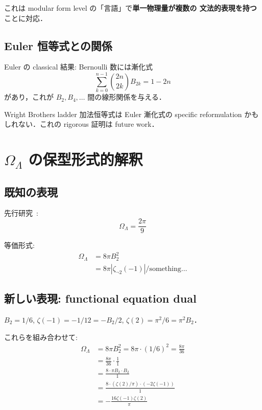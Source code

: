 \documentclass[11pt,a4paper]{article}
\begin{document}
これは modular form level の「言語」で\textbf{単一物理量が複数の
文法的表現を持つ}ことに対応．

\subsection{Euler 恒等式との関係}

Euler の classical 結果: Bernoulli 数には漸化式
\begin{equation}
\sum_{k=0}^{n-1}\binom{2n}{2k} B_{2k} = 1 - 2n
\end{equation}
があり，これが $B_2, B_4, \ldots$ 間の線形関係を与える．

Wright Brothers ladder 加法恒等式は Euler 漸化式の specific
reformulation かもしれない．これの rigorous 証明は future work．

\section{$\Omega_\Lambda$ の保型形式的解釈}

\subsection{既知の表現}

先行研究~\cite{wb-wdw}:
\begin{equation}
\Omega_\Lambda = \frac{2\pi}{9}
\end{equation}

等価形式:
\begin{align}
\Omega_\Lambda &= 8\pi B_2^2\\
&= 8\pi |\zeta_{\neg 2}(-1)|/\text{something}\ldots
\end{align}

\subsection{新しい表現: functional equation dual}

$B_2 = 1/6$, $\zeta(-1) = -1/12 = -B_2/2$, $\zeta(2) = \pi^2/6 = \pi^2 B_2$．

これらを組み合わせて:
\begin{align}
\Omega_\Lambda &= 8\pi B_2^2 = 8\pi \cdot (1/6)^2 = \frac{8\pi}{36}\\
&= \frac{8\pi}{36}\cdot \frac{1}{1}\\
&= \frac{8 \cdot \pi B_2 \cdot B_2}{1}\\
&= \frac{8 \cdot (\zeta(2)/\pi) \cdot (-2\zeta(-1))}{1}\\
&= -\frac{16 \zeta(-1)\zeta(2)}{\pi}
\end{align}
\end{document}
